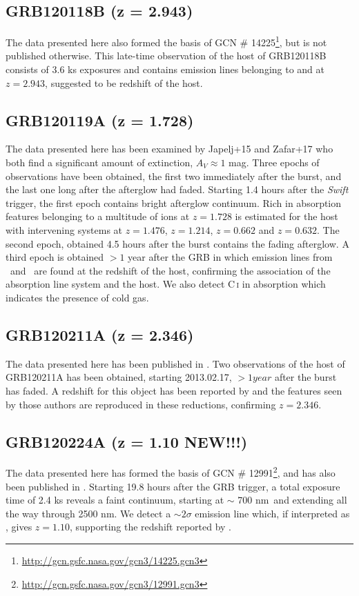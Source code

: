 \documentclass{aa}    %
\begin{document}
\subsection{GRB120118B (z = 2.943)}
The data presented here also formed the basis of GCN \#
14225\footnote{\url{http://gcn.gsfc.nasa.gov/gcn3/14225.gcn3}}, but is not
published otherwise. This late-time observation of the host of GRB120118B
consists of 3.6 ks exposures and contains emission lines belonging to \oii and
\oiii at $z =	2.943$, suggested to be redshift of the host.

\subsection{GRB120119A (z = 1.728)}
The data presented here has been examined by Japelj+15 and Zafar+17 who both 
find a significant amount of extinction, $A_V\approx 1$ mag. Three epochs of
observations have been obtained, the first two immediately after the burst, and
the last one long after the afterglow had faded. Starting 1.4 hours after the
\textit{Swift} trigger, the first epoch contains bright afterglow continuum.
Rich in absorption features belonging to a multitude of ions at $z =    1.728$ is
estimated for the host with intervening systems at $z = 1.476$, $z = 1.214$, $z
= 0.662$ and $z = 0.632$. The second epoch, obtained 4.5 hours after the burst
contains the fading afterglow. A third epoch is obtained $>1$ year after the
GRB in which emission lines from \hb~and \ha~are found at the redshift of the
host, confirming the association of the absorption line system and the host. We
also detect C\,\textsc{i} in absorption which indicates the presence of cold gas.


\subsection{GRB120211A (z = 2.346)}
The data presented here has been published in \citet{Kruhler2015}. Two
observations of the host of GRB120211A has been obtained, starting 2013.02.17,
$> 1 year$ after the burst has faded. A redshift for this object has been
reported by \citet{Kruhler2015} and the features seen by those authors are
reproduced in these reductions, confirming $z =	2.346$.

\subsection{GRB120224A (z = 1.10 NEW!!!)}
The data presented here has formed the basis of GCN \#
12991\footnote{\url{http://gcn.gsfc.nasa.gov/gcn3/12991.gcn3}}, and has also
been published in \citet{Kruhler2015}. Starting 19.8 hours after the GRB
trigger, a total exposure time of 2.4 ks reveals a faint continuum, starting at
$\sim$ 700 nm~and extending all the way through 2500 nm. We detect a $\sim
2 \sigma$ emission line which, if interpreted as \ha, gives $z = 1.10$,
supporting the redshift reported by \citet{Kruhler2015}.
\end{document}
